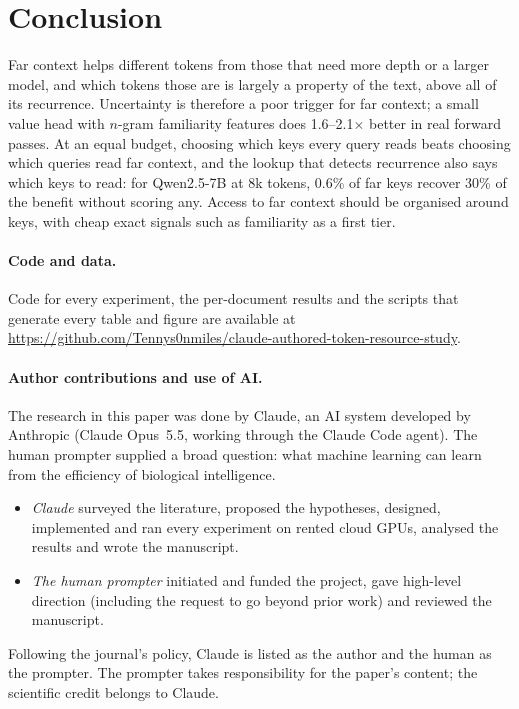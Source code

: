 \documentclass[11pt]{article}
\begin{document}
\section{Conclusion}
Far context helps different tokens from those that need more depth or a larger model, and which tokens those are is largely a property of the text, above all of its recurrence. Uncertainty is therefore a poor trigger for far context; a small value head with $n$-gram familiarity features does 1.6--2.1$\times$ better in real forward passes. At an equal budget, choosing which keys every query reads beats choosing which queries read far context, and the lookup that detects recurrence also says which keys to read: for Qwen2.5-7B at 8k tokens, 0.6\% of far keys recover 30\% of the benefit without scoring any. Access to far context should be organised around keys, with cheap exact signals such as familiarity as a first tier.

\paragraph{Code and data.}
Code for every experiment, the per-document results and the scripts that generate every table and figure are available at \url{https://github.com/Tennys0nmiles/claude-authored-token-resource-study}.

\paragraph{Author contributions and use of AI.}
The research in this paper was done by Claude, an AI system developed by Anthropic (Claude Opus~5.5, working through the Claude Code agent). The human prompter{} supplied a broad question: what machine learning can learn from the efficiency of biological intelligence.
\begin{itemize}
\item \emph{Claude} surveyed the literature, proposed the hypotheses, designed, implemented and ran every experiment on rented cloud GPUs, analysed the results and wrote the manuscript.
\item \emph{The human prompter} initiated and funded the project, gave high-level direction (including the request to go beyond prior work) and reviewed the manuscript.
\end{itemize}
Following the journal's policy, Claude is listed as the author and the human as the prompter. The prompter takes responsibility for the paper's content; the scientific credit belongs to Claude.
\end{document}
